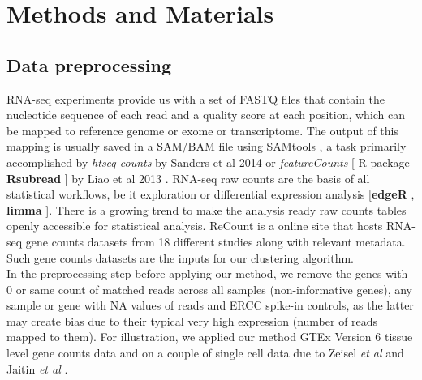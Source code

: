 \section{Methods and Materials}

\subsection{Data preprocessing}

RNA-seq experiments provide us with a set of FASTQ files that contain the nucleotide sequence of each read and a quality score at each position, which can be mapped to  reference genome or exome or transcriptome. The output of this mapping is usually saved in a SAM/BAM file using SAMtools  \cite{Li2009}, a task primarily accomplished by \textit {htseq-counts}  by Sanders et al  2014 \cite{Sanders2014} or \textit{featureCounts}  [ R package \textbf{Rsubread} ] by Liao et al 2013 \cite{Liao2013}.  RNA-seq raw counts are the basis of all statistical workflows, be it exploration or differential expression analysis [\textbf{edgeR} \cite{Robinson2010}, \textbf{limma} \cite{Ritchie2015} ]. There is a growing trend to make the analysis ready raw counts tables openly accessible for statistical analysis. ReCount is a online site that hosts RNA-seq gene counts datasets from 18 different studies \cite{Frazee2011} along with relevant metadata. Such gene counts datasets are the inputs for our clustering algorithm. \\[2 pt]

 In the preprocessing step before applying our method, we remove the genes with 0 or same count of matched reads across all samples (non-informative genes), any sample or gene  with NA values of reads and  ERCC spike-in controls,  as the latter may create bias due to their typical very high expression (number of reads mapped to them).  For illustration, we applied our method GTEx Version 6 tissue level gene counts data \cite{GTEX2013} and on a couple of single cell data due to Zeisel \textit{et al} \cite{Zeisel2015} and Jaitin \textit{et al} \cite{Jaitin2014}. 
 
%
%
%

